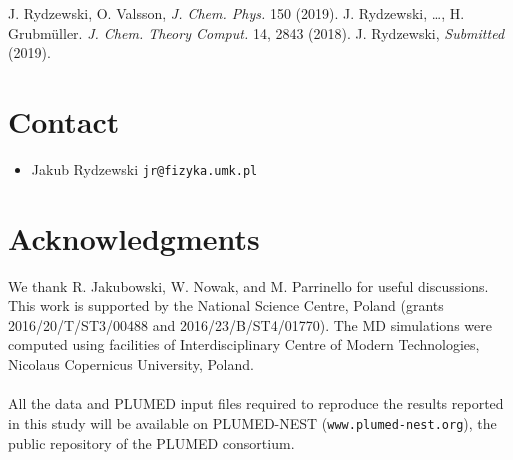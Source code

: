 \documentclass[a0,portrait]{a0poster}
\newcommand{\bi}{\item[\color{myblue}\ding{108}]}
\begin{document}
\begin{multicols}{2}
\color{myblue}
\begin{thebibliography}{6}%
\color{black}
 J. Rydzewski, O. Valsson, \textit{J. Chem. Phys.} 150 (2019).
 J. Rydzewski, \dots, H. Grubm\"{u}ller. \textit{J. Chem. Theory Comput.} 14, 2843 (2018).
 J. Rydzewski, \textit{Submitted} (2019).
\end{thebibliography}
\color{black}

\section*{\color{myblue} Contact}
\begin{itemize}
    \bi Jakub Rydzewski \texttt{jr@fizyka.umk.pl}
\end{itemize}

\section*{\color{myblue} Acknowledgments}
We thank R. Jakubowski, W. Nowak, and M. Parrinello for useful discussions.
This work is supported by the National Science Centre, Poland (grants
2016/20/T/ST3/00488 and 2016/23/B/ST4/01770). The MD simulations were computed
using facilities of Interdisciplinary Centre of Modern Technologies, Nicolaus
Copernicus University, Poland.
\\
\\
All the data and PLUMED input files required to reproduce the results reported in
this study will be available on PLUMED-NEST (\texttt{www.plumed-nest.org}), the public
repository of the PLUMED consortium. 

\end{multicols}
\end{document}
